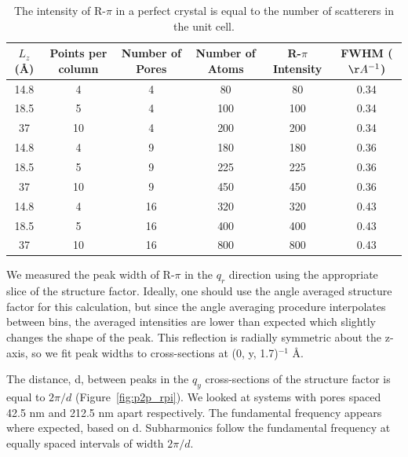 \documentclass{article}
\begin{document}
  \begin{table}
  \centering
  \begin{tabular}{c c c c c c}
  \toprule
  $L_z$ (\AA) & Points per column & Number of Pores &  Number of Atoms & R-$\pi$ Intensity & FWHM ($\AA^{-1}$) \\
  \midrule
  14.8        &      4            &       4          & 80               & 80               & 0.34  \\
  18.5        &      5            &       4          & 100              & 100              & 0.34  \\
  37          &      10           &       4          & 200              & 200              & 0.34  \\
  14.8        &      4            &       9          & 180              & 180              & 0.36  \\
  18.5        &      5            &       9          & 225              & 225              & 0.36  \\
  37          &      10           &       9          & 450              & 450              & 0.36  \\
  14.8        &      4            &       16         & 320              & 320              & 0.43  \\
  18.5        &      5            &       16         & 400              & 400              & 0.43  \\
  37          &      10           &       16         & 800              & 800              & 0.43  \\
  \bottomrule
  \end{tabular}
  \caption{The intensity of R-$\pi$ in a perfect crystal is equal to the number of
  scatterers in the unit cell.}\label{table:perfect_size_dependence}
  \end{table}

  We measured the peak width of R-$\pi$ in the $q_r$ direction using the
  appropriate slice of the structure factor. Ideally, one should use the angle
  averaged structure factor for this calculation, but since the angle averaging
  procedure interpolates between bins, the averaged intensities are lower than
  expected which slightly changes the shape of the peak. This reflection is
  radially symmetric about the z-axis, so we fit peak widths to cross-sections at
  (0, y, 1.7)$^{-1}$ \AA. 

  The distance, d, between peaks in the $q_y$ cross-sections of the structure
  factor is equal to $2\pi / d$ (Figure~\ref{fig:p2p_rpi}). We looked at systems
  with pores spaced 42.5 nm and 212.5 nm apart respectively.  The fundamental
  frequency appears where expected, based on d. Subharmonics follow the
  fundamental frequency at equally spaced intervals of width $2\pi / d$. 
\end{document}

